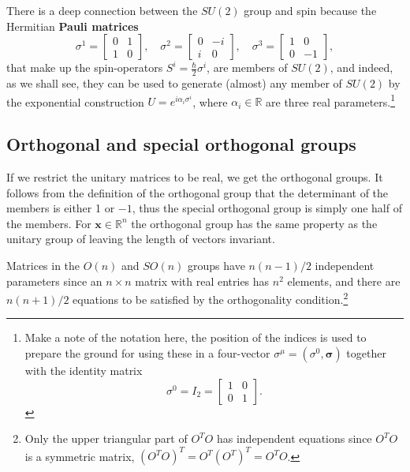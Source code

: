 \documentclass[notes.tex]{subfiles}
\begin{document}
There is a deep connection between the $SU(2)$ group and spin because the Hermitian {\bf Pauli matrices} 
\begin{equation}
\sigma^1 =\left[\begin{matrix} 0 & 1 \\ 1 & 0 \end{matrix}\right], 
\quad \sigma^2 =\left[\begin{matrix} 0 & -i \\ i & 0 \end{matrix}\right], 
\quad \sigma^3 =\left[\begin{matrix} 1 & 0 \\ 0 & -1 \end{matrix}\right],
\label{eq:pauli_matrices}
\end{equation}
that make up the spin-operators $S^i=\frac{\hbar}{2}\sigma^i$, are members of $SU(2)$, and indeed, as we shall see, they can be used to generate (almost) any member of $SU(2)$ by the exponential construction $U=e^{i\alpha_i\sigma^i}$, where $\alpha_i\in\mathbb R$ are three real parameters.\footnote{Make a note of the notation here, the position of the indices is used to prepare the ground for using these in a four-vector $\sigma^\mu=(\sigma^0,\boldsymbol{\sigma})$ together with the identity matrix 
\[ \sigma^0=I_2=\left[ \begin{matrix}1 &0  \\ 0 & 1  \end{matrix} \right].\] }


\subsection{Orthogonal and special orthogonal groups}
If we restrict the unitary matrices to be real, we get the orthogonal groups.
It follows from the definition of the orthogonal group that the determinant of the members is either 1 or $-1$, thus the special orthogonal group is simply one half of the members. For $\mathbf{x} \in \mathbb{R}^n$ the orthogonal group has the same property as the unitary group of leaving the length of vectors invariant. 

Matrices in the $O(n)$ and $SO(n)$ groups have $n(n-1)/2$ independent parameters since an $n\times n$ matrix with real entries has $n^2$ elements, and there are $n(n+1)/2$ equations to be satisfied by the orthogonality condition.\footnote{Only the upper triangular part of $O^TO$ has independent equations since $O^TO$ is a symmetric matrix, $(O^TO)^T=O^T(O^T)^T=O^TO$. } 
\end{document}
